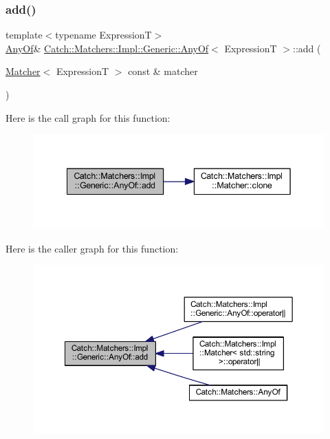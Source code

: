 \subsubsection{\texorpdfstring{add()}{add()}}
{\footnotesize\ttfamily template$<$typename ExpressionT$>$ \\
\hyperlink{class_catch_1_1_matchers_1_1_impl_1_1_generic_1_1_any_of}{Any\+Of}\& \hyperlink{class_catch_1_1_matchers_1_1_impl_1_1_generic_1_1_any_of}{Catch\+::\+Matchers\+::\+Impl\+::\+Generic\+::\+Any\+Of}$<$ ExpressionT $>$\+::add (\begin{DoxyParamCaption}\item[{\hyperlink{struct_catch_1_1_matchers_1_1_impl_1_1_matcher}{Matcher}$<$ ExpressionT $>$ const \&}]{matcher }\end{DoxyParamCaption})\hspace{0.3cm}{\ttfamily [inline]}}

Here is the call graph for this function\+:\nopagebreak
\begin{figure}[H]
\begin{center}
\leavevmode
\includegraphics[width=342pt]{class_catch_1_1_matchers_1_1_impl_1_1_generic_1_1_any_of_a3bce94b627551e5f96c5f9c6060413f0_cgraph}
\end{center}
\end{figure}
Here is the caller graph for this function\+:\nopagebreak
\begin{figure}[H]
\begin{center}
\leavevmode
\includegraphics[width=350pt]{class_catch_1_1_matchers_1_1_impl_1_1_generic_1_1_any_of_a3bce94b627551e5f96c5f9c6060413f0_icgraph}
\end{center}
\end{figure}
\hypertarget{class_catch_1_1_matchers_1_1_impl_1_1_generic_1_1_any_of_adebd5437cdb8e0d54e16e97fe26e7e85}{}\label{class_catch_1_1_matchers_1_1_impl_1_1_generic_1_1_any_of_adebd5437cdb8e0d54e16e97fe26e7e85} 
